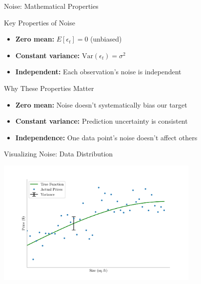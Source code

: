 \documentclass[10pt]{beamer}
\newcommand{\fitpic}[1]{\begin{adjustbox}{max width=\linewidth, max totalheight=0.78\textheight}#1\end{adjustbox}}
\begin{document}
\begin{frame}{Noise: Mathematical Properties}
\small
\begin{definitionbox}{Key Properties of Noise}
\raggedright
\begin{itemize}
\item \textbf{Zero mean:} $E[\epsilon_t] = 0$ (unbiased)
\item \textbf{Constant variance:} $\text{Var}(\epsilon_t) = \sigma^2$
\item \textbf{Independent:} Each observation's noise is independent
\end{itemize}
\end{definitionbox}

\begin{keypointsbox}{Why These Properties Matter}
\raggedright
\begin{itemize}
\item \textbf{Zero mean:} Noise doesn't systematically bias our target
\item \textbf{Constant variance:} Prediction uncertainty is consistent
\item \textbf{Independence:} One data point's noise doesn't affect others
\end{itemize}
\end{keypointsbox}
\end{frame}


\begin{frame}{Visualizing Noise: Data Distribution}
\footnotesize
\begin{center}
\fitpic{\includegraphics[width=0.75\textwidth]{../assets/bias-variance/figures/data-var.pdf}}
\end{center}
\end{frame}
\end{document}

